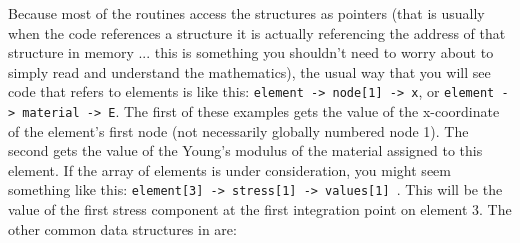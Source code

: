 Because most of the \felt{} routines access the structures as pointers (that is 
usually when the code references a structure it is actually referencing the 
address of that structure in memory ... this is something you shouldn't need 
to worry about to simply read and understand the mathematics), the usual way 
that you will see code that refers to elements is like this: 
\mbox{{\tt element -> node[1] -> x}}, or \mbox{{\tt element -> material -> E}}. 
The first of these 
examples gets the value of the x-coordinate of the element's first node 
(not necessarily globally numbered node 1).  The second gets the value of the 
Young's modulus of the material assigned to this element.  If the array of 
elements is under consideration, you might seem something like this: 
\mbox{{\tt element[3] -> stress[1] -> values[1] }}.  This will be the value of 
the first stress component at the first integration point on element 3.  The 
other common data structures in \felt{} are:

